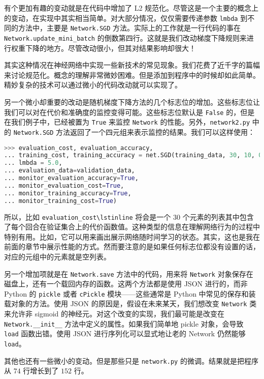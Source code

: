 有个更加有趣的变动就是在代码中增加了 L2 规范化。尽管这是一个主要的概念上的变动，在实现中其实相当简单。对大部分情况，仅仅需要传递参数 \lstinline!lmbda! 到不同的方法中，主要是 \lstinline!Network.SGD! 方法。实际上的工作就是一行代码的事在 \lstinline!Network.update_mini_batch! 的倒数第四行。这就是我们改动梯度下降规则来进行权重下降的地方。尽管改动很小，但其对结果影响却很大！

其实这种情况在神经网络中实现一些新技术的常见现象。我们花费了近千字的篇幅来讨论规范化。概念的理解非常微妙困难。但是添加到程序中的时候却如此简单。精妙复杂的技术可以通过微小的代码改动就可以实现了。

另一个微小却重要的改动是随机梯度下降方法的几个标志位的增加。这些标志位让我们可以对在代价和准确度的监控变得可能。这些标志位默认是 \lstinline!False! 的，但是在我们例子中，已经被置为 \lstinline!True! 来监控 \lstinline!Network! 的性能。另外，\lstinline!network2.py! 中的 \lstinline!Network.SGD! 方法返回了一个四元组来表示监控的结果。我们可以这样使用：
\begin{lstlisting}[language=Python]
>>> evaluation_cost, evaluation_accuracy, 
... training_cost, training_accuracy = net.SGD(training_data, 30, 10, 0.5,
... lmbda = 5.0,
... evaluation_data=validation_data,
... monitor_evaluation_accuracy=True,
... monitor_evaluation_cost=True,
... monitor_training_accuracy=True,
... monitor_training_cost=True)
\end{lstlisting}

所以，比如 \lstinline!evaluation_cost\lstinline! 将会是一个 $30$ 个元素的列表其中包含了每个回合在验证集合上的代价函数值。这种类型的信息在理解网络行为的过程中特别有用。比如，它可以用来画出展示网络随时间学习的状态。其实，这也是我在前面的章节中展示性能的方式。然而要注意的是如果任何标志位都没有设置的话，对应的元组中的元素就是空列表。

另一个增加项就是在 \lstinline!Network.save! 方法中的代码，用来将 \lstinline!Network! 对象保存在磁盘上，还有一个载回内存的函数。这两个方法都是使用 JSON 进行的，而非 Python 的 \lstinline!pickle! 或者 \lstinline!cPickle! 模块——这些通常是 Python 中常见的保存和装载对象的方法。使用 JSON 的原因是，假设在未来某天，我们想改变 \lstinline!Network! 类来允许非 sigmoid 的神经元。对这个改变的实现，我们最可能是改变在 \lstinline!Network.__init__! 方法中定义的属性。如果我们简单地 pickle 对象，会导致 \lstinline!load! 函数出错。使用 JSON 进行序列化可以显式地让老的 Network 仍然能够 \lstinline!load!。

其他也还有一些微小的变动。但是那些只是 \lstinline!network.py! 的微调。结果就是把程序从 $74$ 行增长到了 $152$ 行。

